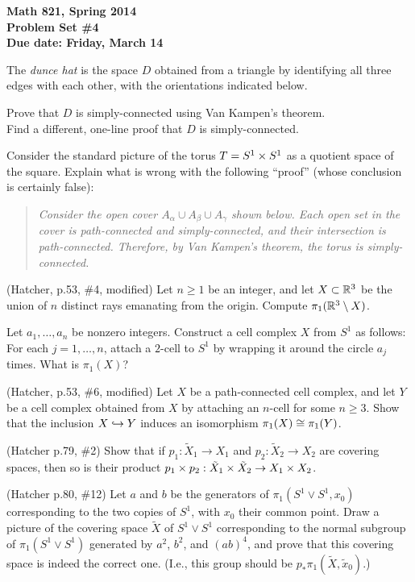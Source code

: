 
\usepackage{youngtab}

\thispagestyle{empty}
{\bf Math 821, Spring 2014\\
Problem Set \#4\\
Due date: Friday, March 14}

\prob The \emph{dunce hat} is the space $D$ obtained from a triangle
by identifying all three edges with each other, with the orientations
indicated below.

\probpart  Prove that $D$ is simply-connected using Van Kampen's theorem.\\
\probpart  Find a different, one-line proof that $D$ is simply-connected.


\prob Consider the standard picture of the torus $T=S^1\times S^1$
as a quotient space of the square.  Explain what is wrong with the following ``proof''
(whose conclusion is certainly false):

\begin{quotation}
\emph{Consider the open cover $A_\alpha\cup A_\beta\cup A_\gamma$ shown below.
Each open set in the cover is path-connected and simply-connected, and their intersection is path-connected.
Therefore, by Van Kampen's theorem, the torus is simply-connected.}
\end{quotation}


\prob (Hatcher, p.53, \#4, modified) Let $n\geq 1$ be an integer, and 
let $X\subset\mathbb{R}^3$ be the union of $n$ distinct rays emanating from the 
origin.  Compute $\pi_1(\mathbb{R}^3\setminus X)$.

\prob Let $a_1,\dots,a_n$ be nonzero integers.  
Construct a cell complex $X$ from $S^1$ as follows:
For each $j=1,\dots,n$, attach a $2$-cell to $S^1$ by wrapping
it around the circle $a_j$ times.  What is $\pi_1(X)$?

\prob (Hatcher, p.53, \#6, modified) Let $X$ be a path-connected cell 
complex, and let $Y$ be a cell complex obtained from $X$ by attaching an 
$n$-cell for some $n\geq 3$.  Show that the inclusion $X\hookrightarrow Y$ induces 
an isomorphism $\pi_1(X)\cong\pi_1(Y)$.

\prob (Hatcher p.79, \#2) Show that if $p_1:\tilde X_1\to X_1$ and $p_2:\tilde X_2\to X_2$ are covering spaces, then so is their product $p_1\times p_2:\tilde X_1\times\tilde X_2\to X_1\times X_2$.


\prob (Hatcher p.80, \#12) Let $a$ and $b$ be the generators of $\pi_1(S^1\vee S^1,x_0)$ corresponding to the two copies of $S^1$, with $x_0$ their common point.  Draw a picture of the covering space $\tilde X$ of $S^1\vee S^1$ corresponding to the normal subgroup of $\pi_1(S^1\vee S^1)$ generated by $a^2$, $b^2$, and $(ab)^4$, and prove that this covering space is indeed the correct one.  (I.e., this group should be $p_*\pi_1(\tilde X,\tilde x_0)$.) 




